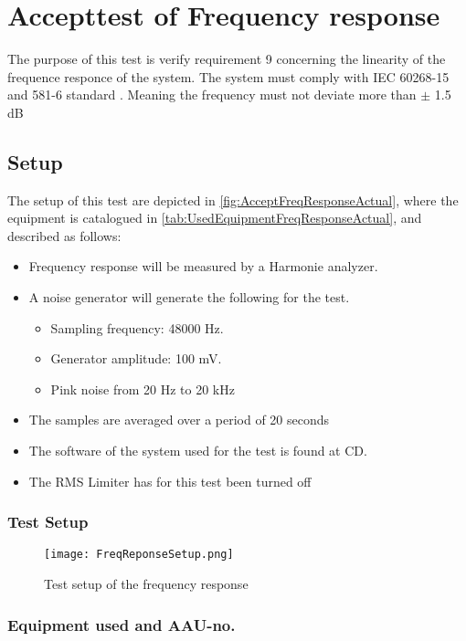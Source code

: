 \chapter{Accepttest of Frequency response}\label{app:journal_Frequency_Response}
The purpose of this test is verify requirement 9 concerning the linearity of the frequence responce of the system. The system must comply with IEC 60268-15 and 581-6 standard \citep{IEC60268}. Meaning the frequency must not deviate more than $\pm$ 1.5 dB

\section{Setup}
The setup of this test are depicted in \autoref{fig:AcceptFreqResponseActual}, where the equipment is catalogued in \autoref{tab:UsedEquipmentFreqResponseActual}, and described as follows:
\begin{itemize}\addtolength{\itemsep}{-.35\baselineskip} 
\item Frequency response will be measured by a Harmonie analyzer.
\item A noise generator will generate the following for the test. 
\begin{itemize}\addtolength{\itemsep}{-.35\baselineskip} 
\item Sampling frequency: 48000 Hz.
\item Generator amplitude: 100 mV.
\item Pink noise from 20 Hz to 20 kHz
\end{itemize}
\item The samples are averaged over a period of 20 seconds
\item The software of the system used for the test is found at CD. 
\item The RMS Limiter has for this test been turned off 
\end{itemize}
\subsection*{Test Setup}
\begin{figure}[H]
\centering
\texttt{[image: FreqReponseSetup.png]}
\caption{Test setup of the frequency response}
\label{fig:AcceptFreqResponseActual}
\end{figure}

\subsection*{Equipment used and AAU-no.}

